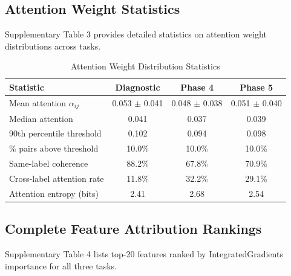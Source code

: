 \documentclass[11pt]{article}
\begin{document}
\subsection{Attention Weight Statistics}

Supplementary Table 3 provides detailed statistics on attention weight distributions across tasks.

\begin{table}[H]
\centering
\caption{Attention Weight Distribution Statistics}
\label{tab:supp_attention_stats}
\begin{tabular}{lccc}
\toprule
\textbf{Statistic} & \textbf{Diagnostic} & \textbf{Phase 4} & \textbf{Phase 5} \\
\midrule
Mean attention $\alpha_{ij}$ & 0.053 $\pm$ 0.041 & 0.048 $\pm$ 0.038 & 0.051 $\pm$ 0.040 \\
Median attention & 0.041 & 0.037 & 0.039 \\
90th percentile threshold & 0.102 & 0.094 & 0.098 \\
\% pairs above threshold & 10.0\% & 10.0\% & 10.0\% \\
Same-label coherence & 88.2\% & 67.8\% & 70.9\% \\
Cross-label attention rate & 11.8\% & 32.2\% & 29.1\% \\
Attention entropy (bits) & 2.41 & 2.68 & 2.54 \\
\bottomrule
\end{tabular}
\end{table}

\subsection{Complete Feature Attribution Rankings}

Supplementary Table 4 lists top-20 features ranked by IntegratedGradients importance for all three tasks.
\end{document}
